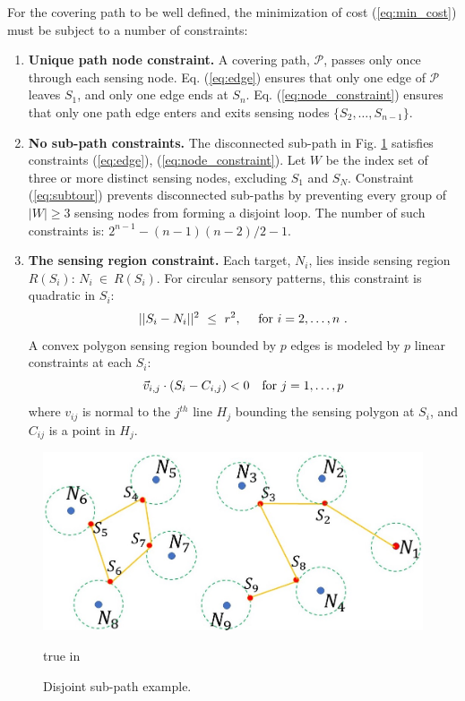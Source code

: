 \documentclass[letterpaper, 10 pt, conference]{ieeeconf}
\theoremstyle{definition}
\begin{document}
For the covering path to be well defined, the minimization of cost (\ref{eq:min_cost}) must be subject to a number of constraints:
%
\begin{enumerate}
\item{} {\bf Unique path node constraint.}  A covering path, $\mathcal{P}$, passes only once through each sensing node.  Eq. (\ref{eq:edge}) ensures that only one edge of $\mathcal{P}$ leaves $S_1$, and only one edge ends at $S_n$. Eq. (\ref{eq:node_constraint}) ensures that only one path edge enters and exits sensing nodes $\{S_2,\ldots,S_{n-1}\}$.
%
\item{} {\bf No sub-path constraints.} The disconnected sub-path in Fig. \ref{fig:subtour} satisfies constraints (\ref{eq:edge}),  (\ref{eq:node_constraint}). Let $W$ be the index set of three or more distinct sensing nodes, excluding $S_1$ and $S_N$.  Constraint (\ref{eq:subtour}) prevents disconnected sub-paths by preventing every group of $|W|\ge 3$ sensing nodes from forming a disjoint loop.  The number of such constraints is: $ 2^{n-1}-(n-1)(n-2)/2-1$.
% 
\item{} {\bf The sensing region constraint.}  Each target, $N_i$, lies inside sensing region $R(S_i)$: $N_i\ \in\ R(S_i)$.  For circular sensory patterns, this constraint is quadratic in $S_i$:  
     \begin{equation}\label{eq:quadratic}
        ||S_i - N_i||^2\ \le \ r^2, \ \ \ \ {\rm for}\ i=2,\ldots,n\ .
     \end{equation}
A convex polygon sensing region bounded by $p$ edges is modeled by
$p$ linear constraints at each $S_i$:
  \begin{equation}\label{eq:polytope}
    \vec{v}_{i,j}\cdot(S_i-C_{i,j})< 0\ \ \  {\rm for}\  j=1,\ldots, p
  \end{equation}
where $v_{ij}$ is normal to the $j^{th}$ line $H_j$ bounding the sensing polygon at $S_i$, and $C_{ij}$ is a point in $H_j$.
\end{enumerate}

\begin{figure}
\centerline{  \includegraphics[height=1.4 true in]{DisjointSubtour.jpg}}
  \caption{Disjoint sub-path example. 
  }
  \label{fig:subtour}
   true in
\end{figure}
\end{document}
